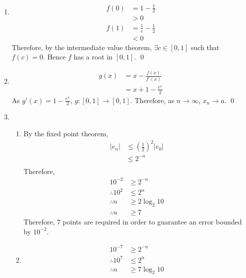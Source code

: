 \documentclass[fleqn, a4paper, 11pt, oneside]{amsart}
\theoremstyle{definition}
\theoremstyle{theorem}
\begin{document}
\begin{solution}
	\begin{enumerate}[leftmargin=*]
		\item
			\begin{align*}
				f(0) & = 1 - \frac{1}{2} \\
                                     & > 0
			\end{align*}
			\begin{align*}
				f(1) & = \frac{1}{e} - \frac{1}{2} \\
                                     & < 0
			\end{align*}
			Therefore, by the intermediate value theorem, $\exists c \in [0,1]$ such that $f(c) = 0$.
			Hence $f$ has a root in $[0,1]$.
			\qed
		\item
			\begin{align*}
				g(x) & = x - \frac{f(x)}{f'(x)} \\
                                     & = x + 1 - \frac{e^x}{2}
			\end{align*}
			As $g'(x) = 1 - \frac{e^x}{2}$, $g : [0,1] \to [0,1]$.
			Therefore, as $n \to \infty$, $x_n \to a$.
			\qed
		\item
			\begin{enumerate}[leftmargin=*]
				\item
					By the fixed point theorem,
					\begin{align*}
						|e_n| & \le \left( \frac{1}{2} \right)^2 |e_0| \\
                                                      & \le 2^{-n}                             \\
					\end{align*}
					Therefore,
					\begin{align*}
						10^{-2}         & \ge 2^{-n}        \\
						\therefore 10^2 & \le 2^n           \\
						\therefore n    & \ge 2 \log_{2} 10 \\
						\therefore n    & \ge 7
					\end{align*}
					Therefore, $7$ points are required in order to guarantee an error bounded by $10^{-2}$.
				\item
					\begin{align*}
						10^{-7}         & \ge 2^{-n}\\
						\therefore 10^7 & \le 2^n\\
						\therefore n    & \ge 7 \log_{2} 10\\

\end{align*}
\end{enumerate}
\end{enumerate}
\end{solution}
\end{document}
